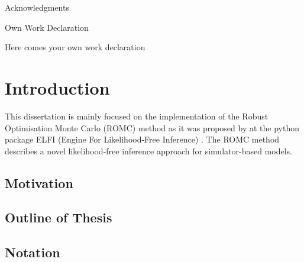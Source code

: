 \documentclass[11pt,twoside]{article}
\numberwithin{Theorem}{section}
\numberwithin{Definition}{section}
\numberwithin{Lemma}{section}
\numberwithin{Algorithm}{section}
\numberwithin{equation}{section}
\begin{document}
\begin{center}
\Large{Acknowledgments}
\end{center}


\clearpage

\begin{center}
\Large{Own Work Declaration}
\end{center}

Here comes your own work declaration

\cleardoublepage



\pagestyle{plain}
\setcounter{page}{1}

\tableofcontents
\clearpage
\listoftables
\listoffigures
\cleardoublepage

\setcounter{page}{1}

\nocite{*}

\clearpage
\section{Introduction}
\label{sec:introduction}
This dissertation is mainly focused on the implementation of the Robust Optimisation Monte Carlo (ROMC) method as it was proposed by \autocite{Ikonomov2019} at the python package ELFI (Engine For Likelihood-Free Inference) \autocite{1708.00707}. The ROMC method describes a novel likelihood-free inference approach for simulator-based models.

\subsection{Motivation}
\label{subsec:motivation}
% 


\subsection{Outline of Thesis}
\label{subsec:outline-of-thesis}
% 


\subsection{Notation}
\label{subsec:notation}
% 

\end{document}
